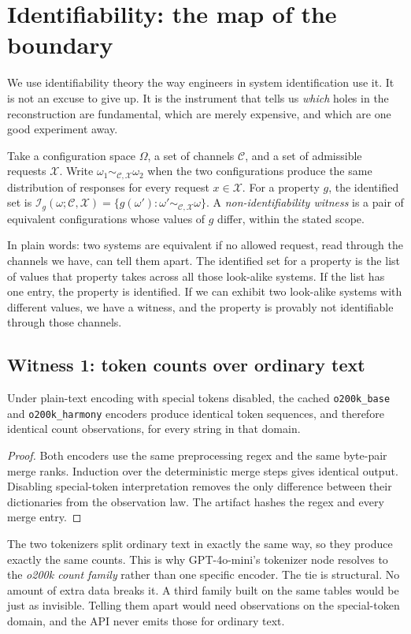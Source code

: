 \section{Identifiability: the map of the boundary}
\label{sec:ident}
We use identifiability theory the way engineers in system identification use it.  It
is not an excuse to give up.  It is the instrument that tells us \emph{which} holes in
the reconstruction are fundamental, which are merely expensive, and which are one good
experiment away.

\begin{definition}
\label{def:identified}
Take a configuration space $\Omega$, a set of channels $\mathcal C$, and a set of
admissible requests $\mathcal X$.  Write $\omega_1\sim_{\mathcal C,\mathcal X}\omega_2$
when the two configurations produce the same distribution of responses for every request
$x\in\mathcal X$.  For a property $g$, the identified set is
$\mathcal I_g(\omega;\mathcal C,\mathcal X)=\{g(\omega'):\omega'\sim_{\mathcal C,\mathcal X}\omega\}$.
A \emph{non-identifiability witness} is a pair of equivalent configurations whose
values of $g$ differ, within the stated scope.
\end{definition}
In plain words: two systems are equivalent if no allowed request, read through the
channels we have, can tell them apart.  The identified set for a property is the list
of values that property takes across all those look-alike systems.  If the list has one
entry, the property is identified.  If we can exhibit two look-alike systems with
different values, we have a witness, and the property is provably not identifiable
through those channels.

\subsection{Witness 1: token counts over ordinary text}
\begin{proposition}
\label{prop:tok}
Under plain-text encoding with special tokens disabled, the cached \texttt{o200k\_base}
and \texttt{o200k\_harmony} encoders produce identical token sequences, and therefore
identical count observations, for every string in that domain.
\end{proposition}
\begin{proof}
Both encoders use the same preprocessing regex and the same byte-pair merge ranks.
Induction over the deterministic merge steps gives identical output.  Disabling
special-token interpretation removes the only difference between their dictionaries
from the observation law.  The artifact hashes the regex and every merge entry.
\end{proof}
The two tokenizers split ordinary text in exactly the same way, so they produce exactly
the same counts.  This is why GPT-4o-mini's tokenizer node resolves to the \emph{o200k
count family} rather than one specific encoder.  The tie is structural.  No amount of
extra data breaks it.  A third family built on the same tables would be just as
invisible.  Telling them apart would need observations on the special-token domain,
and the API never emits those for ordinary text.


